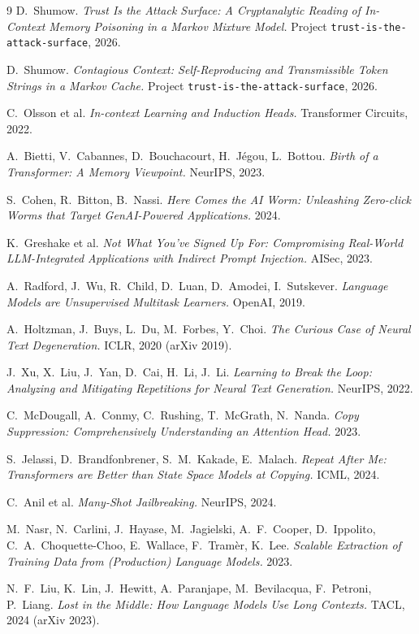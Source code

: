 \documentclass[11pt]{article}
\theoremstyle{plain}
\theoremstyle{definition}
\theoremstyle{remark}
\begin{document}
\begin{thebibliography}{9}
 D.\ Shumow. \emph{Trust Is the Attack Surface: A Cryptanalytic
Reading of In-Context Memory Poisoning in a Markov Mixture Model.} Project
\texttt{trust-is-the-attack-surface}, 2026.

 D.\ Shumow. \emph{Contagious Context: Self-Reproducing and
Transmissible Token Strings in a Markov Cache.} Project
\texttt{trust-is-the-attack-surface}, 2026.

 C.\ Olsson et al. \emph{In-context Learning and Induction Heads.}
Transformer Circuits, 2022.

 A.\ Bietti, V.\ Cabannes, D.\ Bouchacourt, H.\ J\'egou, L.\ Bottou.
\emph{Birth of a Transformer: A Memory Viewpoint.} NeurIPS, 2023.

 S.\ Cohen, R.\ Bitton, B.\ Nassi. \emph{Here Comes the AI Worm:
Unleashing Zero-click Worms that Target GenAI-Powered Applications.} 2024.

 K.\ Greshake et al. \emph{Not What You've Signed Up For:
Compromising Real-World LLM-Integrated Applications with Indirect Prompt Injection.}
AISec, 2023.

 A.\ Radford, J.\ Wu, R.\ Child, D.\ Luan, D.\ Amodei, I.\ Sutskever.
\emph{Language Models are Unsupervised Multitask Learners.} OpenAI, 2019.

 A.\ Holtzman, J.\ Buys, L.\ Du, M.\ Forbes, Y.\ Choi. \emph{The Curious
Case of Neural Text Degeneration.} ICLR, 2020 (arXiv 2019).

 J.\ Xu, X.\ Liu, J.\ Yan, D.\ Cai, H.\ Li, J.\ Li. \emph{Learning to Break the
Loop: Analyzing and Mitigating Repetitions for Neural Text Generation.} NeurIPS, 2022.

 C.\ McDougall, A.\ Conmy, C.\ Rushing, T.\ McGrath, N.\ Nanda.
\emph{Copy Suppression: Comprehensively Understanding an Attention Head.} 2023.

 S.\ Jelassi, D.\ Brandfonbrener, S.\ M.\ Kakade, E.\ Malach. \emph{Repeat
After Me: Transformers are Better than State Space Models at Copying.} ICML, 2024.

 C.\ Anil et al. \emph{Many-Shot Jailbreaking.} NeurIPS, 2024.

 M.\ Nasr, N.\ Carlini, J.\ Hayase, M.\ Jagielski, A.\ F.\ Cooper, D.\ Ippolito,
C.\ A.\ Choquette-Choo, E.\ Wallace, F.\ Tram\`er, K.\ Lee. \emph{Scalable Extraction of
Training Data from (Production) Language Models.} 2023.

 N.\ F.\ Liu, K.\ Lin, J.\ Hewitt, A.\ Paranjape, M.\ Bevilacqua, F.\ Petroni,
P.\ Liang. \emph{Lost in the Middle: How Language Models Use Long Contexts.} TACL, 2024
(arXiv 2023).
\end{thebibliography}
\end{document}
